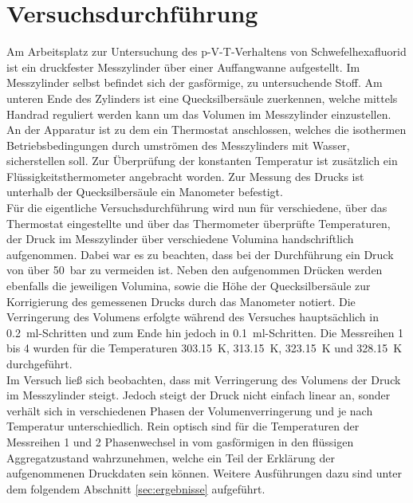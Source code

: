 \newpage
\section{Versuchsdurchführung}
\label{sec:durchfuerung}

Am Arbeitsplatz zur Untersuchung des p-V-T-Verhaltens von Schwefelhexafluorid ist ein druckfester Messzylinder über einer Auffangwanne aufgestellt. Im Messzylinder selbst befindet sich der gasförmige, zu untersuchende Stoff. Am unteren Ende des Zylinders ist eine Quecksilbersäule zuerkennen, welche mittels Handrad reguliert werden kann um das Volumen im Messzylinder einzustellen. An der Apparatur ist zu dem ein Thermostat anschlossen, welches die isothermen Betriebsbedingungen durch umströmen des Messzylinders mit Wasser, sicherstellen soll. Zur Überprüfung der konstanten Temperatur ist zusätzlich ein Flüssigkeitsthermometer angebracht worden. Zur Messung des Drucks ist unterhalb der Quecksilbersäule ein Manometer befestigt.\\
Für die eigentliche Versuchsdurchführung wird nun für verschiedene, über das Thermostat eingestellte und über das Thermometer überprüfte Temperaturen, der Druck im Messzylinder über verschiedene Volumina handschriftlich aufgenommen. Dabei war es zu beachten, dass bei der Durchführung ein Druck von über \SI{50}{\bar} zu vermeiden ist. Neben den aufgenommen Drücken werden ebenfalls die jeweiligen Volumina, sowie die Höhe der Quecksilbersäule zur Korrigierung des gemessenen Drucks durch das Manometer notiert. Die Verringerung des Volumens erfolgte während des Versuches hauptsächlich in \SI{0,2}{ml}-Schritten und zum Ende hin jedoch in \SI{0,1}{ml}-Schritten. Die Messreihen 1 bis 4 wurden für die Temperaturen \SI{303,15}{\kelvin}, \SI{313,15}{\kelvin}, \SI{323,15}{\kelvin} und \SI{328,15}{\kelvin} durchgeführt.\\

Im Versuch ließ sich beobachten, dass mit Verringerung des Volumens der Druck im Messzylinder steigt. Jedoch steigt der Druck nicht einfach linear an, sonder verhält sich in verschiedenen Phasen der Volumenverringerung und je nach Temperatur unterschiedlich. Rein optisch sind für die Temperaturen der Messreihen 1 und 2 Phasenwechsel in vom gasförmigen in den flüssigen Aggregatzustand wahrzunehmen, welche ein Teil der Erklärung der aufgenommenen Druckdaten sein können.\linebreak
Weitere Ausführungen dazu sind unter dem folgendem Abschnitt \ref{sec:ergebnisse} aufgeführt.